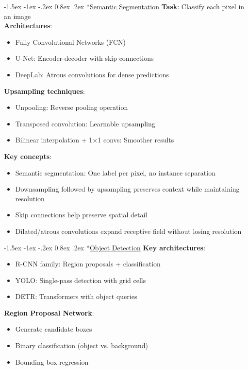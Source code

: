 \documentclass{article}
\makeatletter
\renewcommand\section{\@startsection{section}{1}{\z@}%
                                  {-1.5ex \@plus -1ex \@minus -.2ex}%
                                  {0.8ex \@plus.2ex}%
                                  {\normalfont\small\bfseries}}
\makeatother
\begin{document}
\begin{multicols}{3}
\section*{\underline{Semantic Segmentation}}
\textbf{Task}: Classify each pixel in an image\\
\textbf{Architectures}:
\begin{itemize}
\item Fully Convolutional Networks (FCN)
\item U-Net: Encoder-decoder with skip connections
\item DeepLab: Atrous convolutions for dense predictions
\end{itemize}

\textbf{Upsampling techniques}:
\begin{itemize}
\item Unpooling: Reverse pooling operation
\item Transposed convolution: Learnable upsampling
\item Bilinear interpolation + 1×1 convs: Smoother results
\end{itemize}

\textbf{Key concepts}:
\begin{itemize}
\item Semantic segmentation: One label per pixel, no instance separation
\item Downsampling followed by upsampling preserves context while maintaining resolution
\item Skip connections help preserve spatial detail
\item Dilated/atrous convolutions expand receptive field without losing resolution
\end{itemize}

\section*{\underline{Object Detection}}
\textbf{Key architectures}:
\begin{itemize}
\item R-CNN family: Region proposals + classification
\item YOLO: Single-pass detection with grid cells
\item DETR: Transformers with object queries
\end{itemize}

\textbf{Region Proposal Network}:
\begin{itemize}
\item Generate candidate boxes
\item Binary classification (object vs. background)
\item Bounding box regression
\end{itemize}


\end{multicols}
\end{document}
